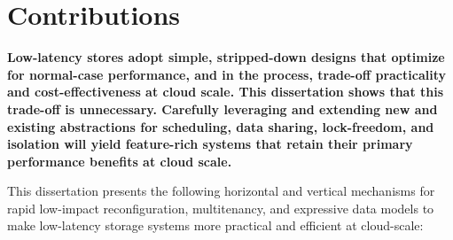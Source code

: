 %

\section{Contributions}

{\bf
  Low-latency stores adopt simple, stripped-down designs that optimize
  for normal-case performance, and in the process, trade-off
  practicality and cost-effectiveness at cloud scale.
%
  This dissertation shows that this trade-off is unnecessary. Carefully
  leveraging and extending new and existing abstractions for scheduling,
  data sharing, lock-freedom, and isolation will yield feature-rich
  systems that
  retain their primary performance benefits at cloud scale.
}

This dissertation presents the following horizontal and vertical mechanisms
for rapid low-impact reconfiguration, multitenancy, and expressive data
models to make low-latency storage systems more practical and efficient
at cloud-scale:

